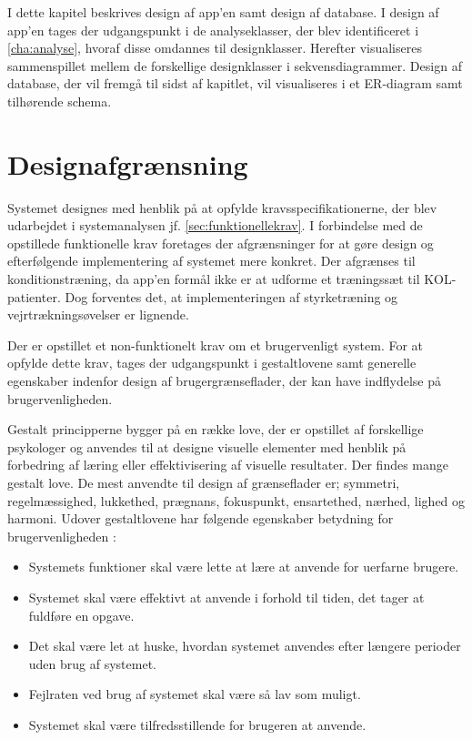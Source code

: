 I dette kapitel beskrives design af app'en samt design af database. I design af app'en tages der udgangspunkt i de analyseklasser, der blev identificeret i \autoref{cha:analyse}, hvoraf disse omdannes til designklasser. Herefter visualiseres sammenspillet mellem de forskellige designklasser i sekvensdiagrammer. Design af database, der vil fremgå til sidst af kapitlet, vil visualiseres i et ER-diagram samt tilhørende schema. 

\section{Designafgrænsning} \label{sec:brugervenlighed}
Systemet designes med henblik på at opfylde kravsspecifikationerne, der blev udarbejdet i systemanalysen jf. \autoref{sec:funktionellekrav}. I forbindelse med de opstillede funktionelle krav foretages der afgrænsninger for at gøre design og efterfølgende implementering af systemet mere konkret. Der afgrænses til konditionstræning, da app'en formål ikke er at udforme et træningssæt til KOL-patienter. Dog forventes det, at implementeringen af styrketræning og vejrtrækningsøvelser er lignende. 

Der er opstillet et non-funktionelt krav om et brugervenligt system. For at opfylde dette krav, tages der udgangspunkt i gestaltlovene samt generelle egenskaber indenfor design af brugergrænseflader, der kan have indflydelse på brugervenligheden. 

Gestalt principperne bygger på en række love, der er opstillet af forskellige psykologer og anvendes til at designe visuelle elementer med henblik på forbedring af læring eller effektivisering af visuelle resultater. Der findes mange gestalt love. De mest anvendte til design af grænseflader er; symmetri, regelmæssighed, lukkethed, prægnans, fokuspunkt, ensartethed, nærhed, lighed og harmoni.\cite{Chang2002} Udover gestaltlovene har følgende egenskaber betydning for brugervenligheden \cite{ferre2001}:
\begin{itemize}
\item Systemets funktioner skal være lette at lære at anvende for uerfarne brugere.
\item Systemet skal være effektivt at anvende i forhold til tiden, det tager at fuldføre en opgave.
\item Det skal være let at huske, hvordan systemet anvendes efter længere perioder uden brug af systemet.
\item Fejlraten ved brug af systemet skal være så lav som muligt.
\item Systemet skal være tilfredsstillende for brugeren at anvende.
\end{itemize}
 

 





